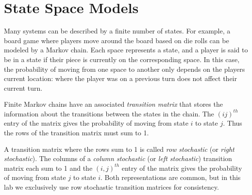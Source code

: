 \label{lab:Markov}

\section*{State Space Models} %

Many systems can be described by a finite number of states.
For example, a board game where players move around the board based on die rolls can be modeled by a Markov chain.
Each space represents a state, and a player is said to be in a state if their piece is currently on the corresponding space.
In this case, the probability of moving from one space to another only depends on the players current location: where the player was on a previous turn does not affect their current turn.

Finite Markov chains have an associated \emph{transition matrix} that stores the information about the transitions between the states in the chain.
The $(ij)^{th}$ entry of the matrix gives the probability of moving from state $i$ to state $j$.
Thus the rows of the transition matrix must sum to 1.

\begin{info} %
A transition matrix where the rows sum to 1 is called \emph{row stochastic} (or \emph{right stochastic}).
The columns of a \emph{column stochastic} (or \emph{left stochastic}) transition matrix each sum to 1 and the $(i,j)^{th}$ entry of the matrix gives the probability of moving from state $j$ to state $i$.
Both representations are common, but in this lab we exclusively use row stochastic transition matrices for consistency.
\end{info}

